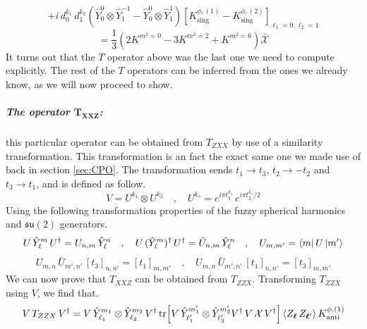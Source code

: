 %
%
\begin{equation*}
+
i \, d_0^{k_1} \, d_1^{k_2} \left(
\hat{Y}^{0}_{0} \otimes \hat{Y}^{-1}_{1}
-
\hat{Y}^{0}_{0} \otimes \hat{Y}^{1}_{1}
\right)
\left[
K^{\phi,(1)}_{\mathrm{sing}} - K^{\phi,(2)}_{\mathrm{sing}}
\right]_{\ell_1=0,\ell_2=1}
\end{equation*}
%
%
\begin{equation}\label{T_ZZX}
=
\frac{1}{3}
\left(
2 K^{m^2 = 0}
- 3 K^{m^2 = 2}
+ K^{m^2 = 6}
\right)
\bar{\mathcal{X}}
\end{equation}
%
%
It turns out that the $T$ operator above was the last one we need to compute explicitly. The rest of the $T$ operators can be inferred from the ones we already know, as we will now proceed to show.

\subparagraph[The operator $T_{XXZ}$]{The operator $\mathbf{T_{XXZ}}$:} this particular operator can be obtained from $T_{ZXX}$ by use of a similarity transformation. This transformation is an fact the exact same one we made use of back in section \ref{sec:CPO}. The transformation sends $t_1 \to t_3$, $t_2 \to -t_2$ and $t_3 \to t_1$, and is defined as follow.
%
%
\begin{equation}\label{similarity transform 1}
V = U^{k_1} \otimes U^{k_2}
%
\quad , \quad
%
U^{k_s} = e^{i \pi t_3^{k_s}} \, e^{i \pi t_2^{k_s} / 2}
\end{equation}
%
%
Using the following transformation properties of the fuzzy spherical harmonics and $\mathfrak{su}(2)$ generators.
%
%
\begin{equation}
U \, \hat{Y}^m_\ell \, U^\dagger
=
U_{n,m} \, \hat{Y}^n_\ell
%
\quad , \quad
%
U \, (\hat{Y}^m_\ell)^{\dagger} \, U^\dagger
=
\bar{U}_{n,m} \, \hat{Y}^n_\ell
%
\quad , \quad
%
U_{m,m'} = \bra{m} U \ket{m'}
\end{equation}
%
%
\begin{equation}
U_{m,n} \, \bar{U}_{m',n'} \, [t_3]_{n,n'} = [t_1]_{m,m'}
%
\quad , \quad
%
U_{m,n} \, \bar{U}_{m',n'} \, [t_1]_{n,n'} = [t_3]_{m,m'}
\end{equation}
%
%
We can now prove that $T_{XXZ}$ can be obtained from $T_{ZZX}$. Transforming $T_{ZZX}$ using $V$, we find that.
%
%
\begin{equation*}
V \, T_{ZZX} \, V^\dagger
=
V \, \hat{Y}_{\ell_1}^{m_1} \otimes \hat{Y}_{\ell_2}^{m_2} \, V^\dagger
\tr[V \, \hat{Y}_{\ell_1'}^{m_1'} \otimes \hat{Y}_{\ell_2'}^{m_2'} V^\dagger \, V \, \mathcal{X} \, V^\dagger]
\expval{Z_{\boldsymbol{\ell}} \, Z_{\boldsymbol{\ell}'}}K^{\phi,(1)}_{\mathrm{anti}}
\end{equation*}
